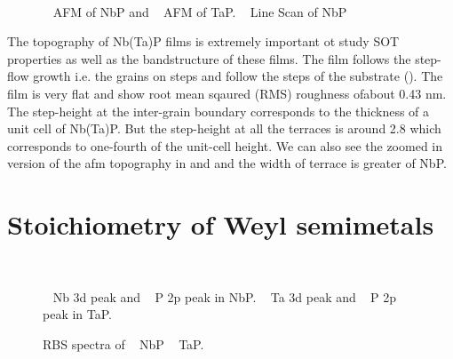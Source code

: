 \begin{figure}
    \centering
    \\
    \caption{
        \sfA~ AFM of NbP and 
        \sfB~ AFM of TaP.
        \sfC~ Line Scan of NbP
    }
\end{figure}

The topography of Nb(Ta)P films is extremely important ot study SOT properties as well as the 
bandstructure of these films. The film follows the step-flow growth i.e. the grains on steps and follow
the steps of the substrate (). The film is very flat and show root mean sqaured (RMS) 
roughness ofabout 0.43 nm. The step-height at the inter-grain boundary corresponds to the thickness 
of a unit cell of Nb(Ta)P. But the step-height at all the terraces is around 2.8 \angstrom which 
corresponds to one-fourth of the unit-cell height. We can also see the zoomed in version of the 
afm topography in  and  and the width of terrace is greater of 
NbP.


\section{Stoichiometry of Weyl semimetals}

\begin{figure}
    \centering
    \\
    \caption{
        \sfA~ Nb 3d peak and
        \sfB~ P 2p peak in 
        NbP. 
        \sfC~ Ta 3d peak and
        \sfD~ P 2p peak in 
        TaP.
    }
\end{figure}

\begin{figure}
    \centering
    \caption{
        RBS spectra of 
        \sfA~ NbP
        \sfB~ TaP.
    }
\end{figure}

